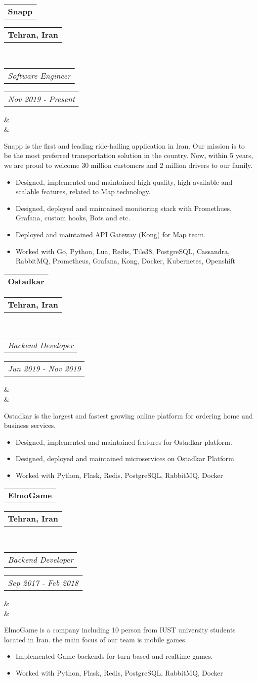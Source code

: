 \documentclass[11pt,a4paper,roman]{moderncv}        %
\makeatletter
\newcommand*{\customcventry}[7][.25em]{
  \begin{tabular}{@{}l}
  {\bfseries #4}
  \end{tabular}
  \hfill%
  \begin{tabular}{l@{}}
  {\bfseries #5}
  \end{tabular} \\
  \begin{tabular}{@{}l}
  {\itshape #3}
  \end{tabular}
  \hfill%
  \begin{tabular}{l@{}}
  {\itshape #2}
  \end{tabular}
  \ifx&#7&%
  \else{\\%
    \begin{minipage}{\maincolumnwidth}%
      \small#7%
    \end{minipage}}\fi%
  \par\addvspace{#1}}
\makeatother
\begin{document}
  {
    \customcventry{Nov 2019 - Present}{Software Engineer}{Snapp}{Tehran, Iran}{}
    \\Snapp is the first and leading ride-hailing application in Iran.
    Our mission is to be the most preferred transportation solution in the country.
    Now, within 5 years, we are proud to welcome 30 million customers and 2 million drivers to our family. \\
    {
      \begin{itemize}
        \item Designed, implemented and maintained high quality, high available and scalable features, related to Map technology.
        \item Designed, deployed and maintained monitoring stack with Promethues, Grafana, custom hooks, Bots and etc.
        \item Deployed and maintained API Gateway (Kong) for Map team.
        \item Worked with Go, Python, Lua, Redis, Tile38, PostgreSQL, Cassandra, RabbitMQ, Prometheus, Grafana, Kong, Docker, Kubernetes, Openshift\\
      \end{itemize}
    }

    \customcventry{Jun 2019 - Nov 2019}{Backend Developer}{Ostadkar}{Tehran, Iran}{}
    \\Ostadkar is the largest and fastest growing online platform for ordering home and business services.\\
    {
      \begin{itemize}
        \item Designed, implemented and maintained features for Ostadkar platform.
        \item Designed, deployed and maintained microservices on Ostadkar Platform
        \item Worked with Python, Flask, Redis, PostgreSQL, RabbitMQ, Docker\\
      \end{itemize}
    }

    \customcventry{Sep 2017 - Feb 2018}{Backend Developer}{ElmoGame}{Tehran, Iran}{}
    \\ElmoGame is a company including 10 person from IUST university students located in Iran.
    the main focus of our team is mobile games.\\
    {
      \begin{itemize}
        \item Implemented Game backends for turn-based and realtime games.
        \item Worked with Python, Flask, Redis, PostgreSQL, RabbitMQ, Docker\\
      \end{itemize}
    }
  }
\end{document}
